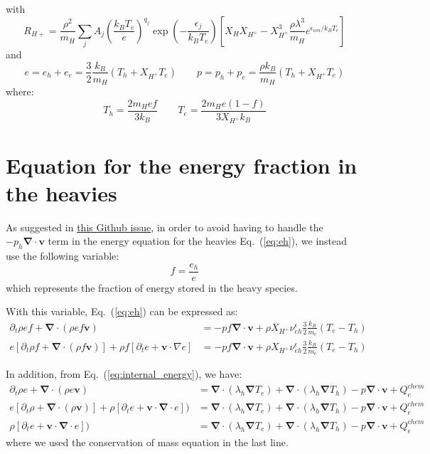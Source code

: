\documentclass[11pt, oneside]{article}   	%
\begin{document}
with 
\[ R_{H+} = \frac{\rho^2}{m_H}\sum_j A_j \left( \frac{k_BT_e}{e} \right)^{q_j}\exp\left( - \frac{\epsilon_j}{k_B T_e} \right)\left[ X_H X_{H^+} - X_{H^+}^3 \frac{\rho \lambda^3}{m_H} e^{\epsilon_{ion}/k_BT_e} \right]  \]
and
\[ e = e_h + e_e =  \frac{3}{2}\frac{k_B}{m_H}(T_h + X_{H^+}T_e) \qquad p = p_h + p_e = \frac{\rho k_B}{m_H}(T_h + X_{H^+}T_e) \]
where:
\[ T_h = \frac{2 m_H e f}{3 k_B} \qquad T_e = \frac{2 m_H e (1 - f)}{3 X_{H^+} k_B} \]
 

\section{Equation for the energy fraction in the heavies}

As suggested in \href{https://github.com/AMReX-Astro/Castro/issues/2679#issuecomment-1887213580}{this Github issue}, in order to avoid having to handle the $-p_h \boldsymbol{\nabla}\cdot \boldsymbol{v}$ term in the energy equation for the heavies Eq.~(\ref{eq:eh}), we instead use the following variable:
\[ f = \frac{e_h}{e} \]
which represents the fraction of energy stored in the heavy species.

With this variable, Eq.~(\ref{eq:eh}) can be expressed as:
\begin{align*} 
\partial_t \rho e f + \boldsymbol{\nabla}\cdot(\rho e f \boldsymbol{v}) &= - p f \boldsymbol{\nabla}\cdot \boldsymbol{v} + \rho X_{H^+}\nu_{eh}^\epsilon \frac{3}{2}\frac{k_B}{m_e}(T_e - T_h) \\
e\left[\partial_t \rho f + \boldsymbol{\nabla}\cdot(\rho f \boldsymbol{v})\right] + \rho f \left[ \partial_t e + \boldsymbol{v}\cdot\nabla e \right] &= - p f \boldsymbol{\nabla}\cdot \boldsymbol{v} + \rho X_{H^+}\nu_{eh}^\epsilon \frac{3}{2}\frac{k_B}{m_e}(T_e - T_h) 
\end{align*}

In addition, from Eq.~(\ref{eq:internal_energy}), we have:
\begin{align*} 
\partial_t \rho e + \boldsymbol{\nabla}\cdot(\rho e \boldsymbol{v}) &= \boldsymbol{\nabla}\cdot(\lambda_h\boldsymbol{\nabla}T_e) + \boldsymbol{\nabla}\cdot(\lambda_h\boldsymbol{\nabla}T_h) - p\boldsymbol{\nabla}\cdot\boldsymbol{v} + Q_e^{chem} \\
 e \left[ \partial_t \rho + \boldsymbol{\nabla}\cdot(\rho \boldsymbol{v}) \right] + \rho \left[\partial_t  e + \boldsymbol{v}\cdot \boldsymbol{\nabla}\cdot e \right]  ) &= \boldsymbol{\nabla}\cdot(\lambda_h\boldsymbol{\nabla}T_e) + \boldsymbol{\nabla}\cdot(\lambda_h\boldsymbol{\nabla}T_h) - p\boldsymbol{\nabla}\cdot\boldsymbol{v} + Q_e^{chem} \\
\rho \left[\partial_t  e + \boldsymbol{v}\cdot \boldsymbol{\nabla}\cdot e \right]  ) &= \boldsymbol{\nabla}\cdot(\lambda_h\boldsymbol{\nabla}T_e) + \boldsymbol{\nabla}\cdot(\lambda_h\boldsymbol{\nabla}T_h) - p\boldsymbol{\nabla}\cdot\boldsymbol{v} + Q_e^{chem} 
\end{align*}
where we used the conservation of mass equation in the last line.
\end{document}
